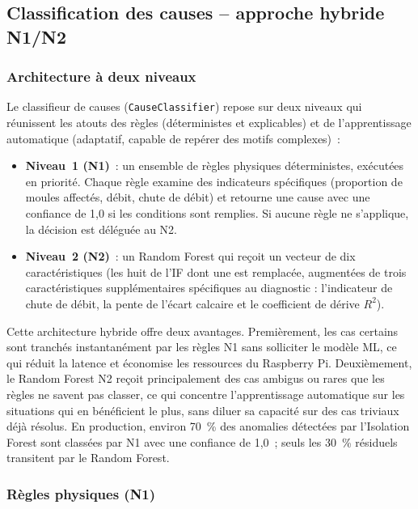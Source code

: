 \subsection{Classification des causes -- approche hybride N1/N2}

\subsubsection{Architecture à deux niveaux}

Le classifieur de causes (\texttt{CauseClassifier}) repose sur deux niveaux qui réunissent les atouts des règles (déterministes et explicables) et de l'apprentissage automatique (adaptatif, capable de repérer des motifs complexes)~:

\begin{itemize}
  \item \textbf{Niveau~1 (N1)}~: un ensemble de règles physiques déterministes, exécutées en priorité. Chaque règle examine des indicateurs spécifiques (proportion de moules affectés, débit, chute de débit) et retourne une cause avec une confiance de 1,0 si les conditions sont remplies. Si aucune règle ne s'applique, la décision est déléguée au N2.
  \item \textbf{Niveau~2 (N2)}~: un Random Forest qui reçoit un vecteur de dix caractéristiques (les huit de l'IF dont une est remplacée, augmentées de trois caractéristiques supplémentaires spécifiques au diagnostic : l'indicateur de chute de débit, la pente de l'écart calcaire et le coefficient de dérive \(R^2\)).
\end{itemize}

Cette architecture hybride offre deux avantages. Premièrement, les cas certains sont tranchés instantanément par les règles N1 sans solliciter le modèle ML, ce qui réduit la latence et économise les ressources du Raspberry Pi. Deuxièmement, le Random Forest N2 reçoit principalement des cas ambigus ou rares que les règles ne savent pas classer, ce qui concentre l'apprentissage automatique sur les situations qui en bénéficient le plus, sans diluer sa capacité sur des cas triviaux déjà résolus. En production, environ 70~\% des anomalies détectées par l'Isolation Forest sont classées par N1 avec une confiance de 1,0~; seuls les 30~\% résiduels transitent par le Random Forest.

\subsubsection{Règles physiques (N1)}

